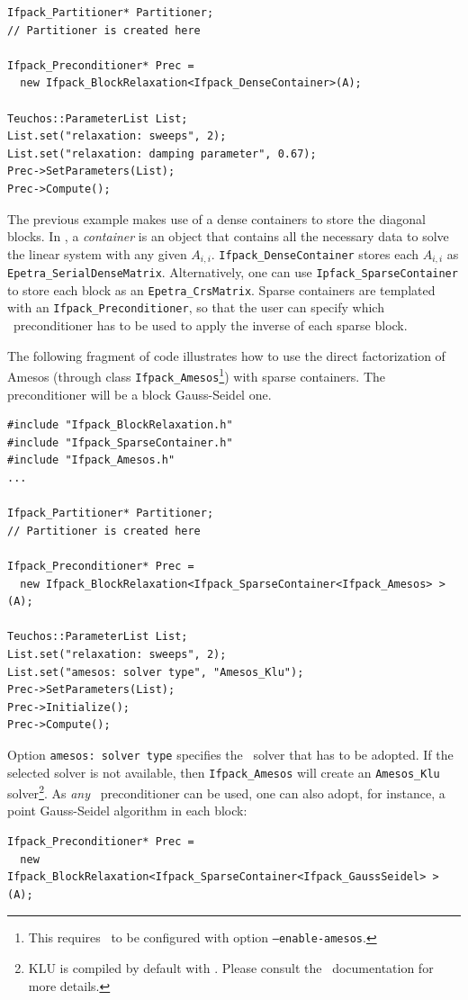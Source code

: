 {\begin{verbatim}
Ifpack_Partitioner* Partitioner;
// Partitioner is created here

Ifpack_Preconditioner* Prec =
  new Ifpack_BlockRelaxation<Ifpack_DenseContainer>(A);

Teuchos::ParameterList List;
List.set("relaxation: sweeps", 2);
List.set("relaxation: damping parameter", 0.67);
Prec->SetParameters(List);
Prec->Compute();
\end{verbatim}
The previous example makes use of a dense containers to store
the diagonal blocks.
In \ifpack, a {\sl container} is an object that contains all the necessary
data to solve the linear system with any given $A_{i,i}$. 
\verb!Ifpack_DenseContainer! stores each $A_{i,i}$ as
\verb!Epetra_SerialDenseMatrix!. Alternatively, one can use 
\verb!Ipfack_SparseContainer! to store each block as an
\verb!Epetra_CrsMatrix!. Sparse containers are templated with an
\verb!Ifpack_Preconditioner!, so that the user can specify which \ifpack\
  preconditioner has to be used to apply the inverse of each sparse block.

The following fragment of code illustrates how to use the direct factorization
of Amesos (through class \verb!Ifpack_Amesos!\footnote{This requires \ifpack\
	   to be configured with option {\tt --enable-amesos}.}) with sparse containers. The preconditioner will be a block Gauss-Seidel one.

\begin{verbatim}
#include "Ifpack_BlockRelaxation.h"
#include "Ifpack_SparseContainer.h"
#include "Ifpack_Amesos.h"
...

Ifpack_Partitioner* Partitioner;
// Partitioner is created here

Ifpack_Preconditioner* Prec =
  new Ifpack_BlockRelaxation<Ifpack_SparseContainer<Ifpack_Amesos> >(A);

Teuchos::ParameterList List;
List.set("relaxation: sweeps", 2);
List.set("amesos: solver type", "Amesos_Klu");
Prec->SetParameters(List);
Prec->Initialize();
Prec->Compute();
\end{verbatim}

Option \verb!amesos: solver type! specifies the \amesos\ solver that
has to be adopted. If the selected solver is not available, then
\verb!Ifpack_Amesos! will create an \verb!Amesos_Klu! solver\footnote{KLU is
  compiled by default with \amesos. Please consult the \amesos\ documentation
    for more details.}.
As {\sl any} \ifpack\ preconditioner can be used, one can also adopt, for
instance, a point Gauss-Seidel algorithm in each block:
\begin{verbatim}
Ifpack_Preconditioner* Prec =
  new Ifpack_BlockRelaxation<Ifpack_SparseContainer<Ifpack_GaussSeidel> >(A);
\end{verbatim}

}
